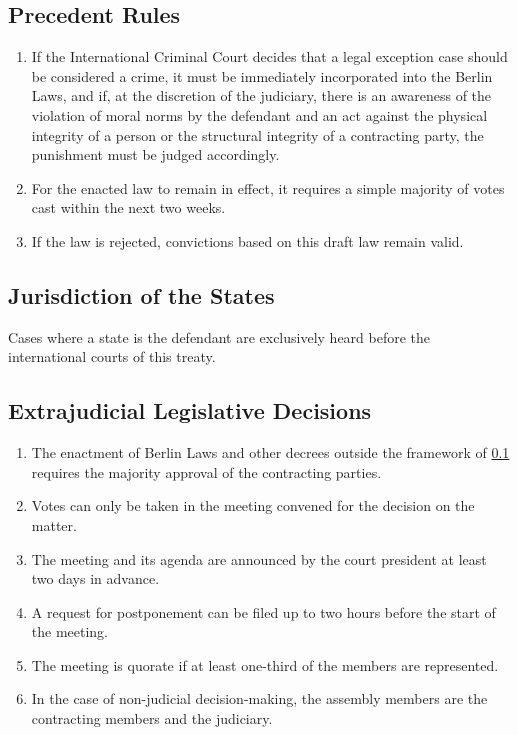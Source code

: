 \documentclass{article}
\begin{document}
\subsection{Precedent Rules}\label{prec}
\begin{enumerate}[(1)]
    \item If the International Criminal Court decides that a legal exception case should be considered a crime, it must be immediately incorporated into the Berlin Laws, and if, at the discretion of the judiciary, there is an awareness of the violation of moral norms by the defendant and an act against the physical integrity of a person or the structural integrity of a contracting party, the punishment must be judged accordingly.
    \item For the enacted law to remain in effect, it requires a simple majority of votes cast within the next two weeks.
    \item If the law is rejected, convictions based on this draft law remain valid.
\end{enumerate}

\subsection{Jurisdiction of the States}
Cases where a state is the defendant are exclusively heard before the international courts of this treaty.

\subsection{Extrajudicial Legislative Decisions}
\begin{enumerate}[(1)]
    \item The enactment of Berlin Laws and other decrees outside the framework of \ref{prec} requires the majority approval of the contracting parties.
    \item Votes can only be taken in the meeting convened for the decision on the matter.
    \item The meeting and its agenda are announced by the court president at least two days in advance.
    \item A request for postponement can be filed up to two hours before the start of the meeting.
    \item The meeting is quorate if at least one-third of the members are represented.
    \item In the case of non-judicial decision-making, the assembly members are the contracting members and the judiciary.
\end{enumerate}
\end{document}
